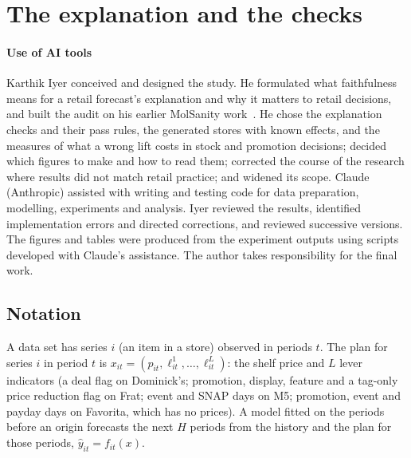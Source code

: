 \section{The explanation and the checks}
\label{sec:checks}

\ifjof
\paragraph{Use of AI tools} Karthik Iyer conceived and designed the study. He formulated what faithfulness means for
a retail forecast's explanation and why it matters to retail decisions, and built the audit on his earlier MolSanity
work~\cite{molsanity}. He chose the explanation checks and their pass rules, the generated stores with known effects,
and the measures of what a wrong lift costs in stock and promotion decisions; decided which figures to make and how to
read them; corrected the course of the research where results did not match retail practice; and widened its scope.
Claude (Anthropic) assisted with writing and testing code for data preparation, modelling, experiments and analysis.
Iyer reviewed the results, identified implementation errors and directed corrections, and reviewed successive
versions. The figures and tables were produced from the experiment outputs using scripts developed with Claude's
assistance. The author takes responsibility for the final work.
\fi

\subsection{Notation}

A data set has series $i$ (an item in a store) observed in periods $t$. The
plan for series $i$ in period $t$ is $x_{it} = (p_{it}, \ell^{1}_{it}, \dots,
\ell^{L}_{it})$: the shelf price and $L$ lever indicators (a deal flag on
Dominick's; promotion, display, feature and a tag-only price reduction
flag on Frat; event and SNAP days on M5; promotion, event and payday days on
Favorita, which has no prices).
A model fitted on the periods before an origin forecasts the next $H$ periods
from the history and the plan for those periods, $\hat y_{it} = f_{it}(x)$.

